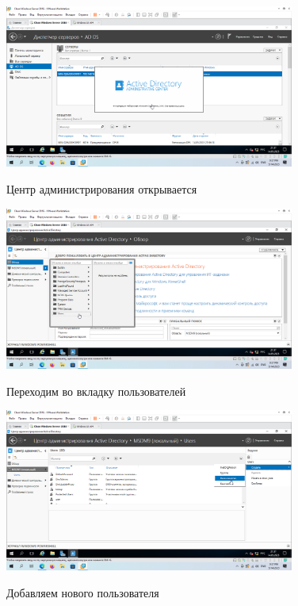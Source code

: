 \documentclass[a4paper]{article}
\begin{document}
  \begin{figure}[H]
    \centering
    \includegraphics[width=0.85\textwidth]{5_0080}
    \label{img:80}
    \caption{Центр администрирования открывается}
  \end{figure}

  \begin{figure}[H]
    \centering
    \includegraphics[width=0.85\textwidth]{5_0081}
    \label{img:81}
    \caption{Переходим во вкладку пользователей}
  \end{figure}

  \begin{figure}[H]
    \centering
    \includegraphics[width=0.85\textwidth]{5_0082}
    \label{img:82}
    \caption{Добавляем нового пользователя}
  \end{figure}
\end{document}
